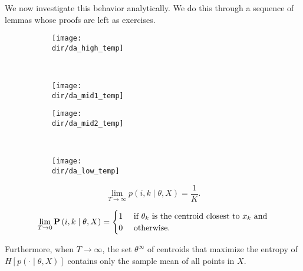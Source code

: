 We now investigate this behavior analytically. We do this through a
sequence of lemmas whose proofs are left as exercises.

\begin{figure}
    \centering
    \begin{subfigure}[b]{0.4\textwidth}
        \texttt{[image: \\dir/da\_high\_temp]}
        \caption{}
        \label{fig:da_high_temp}
    \end{subfigure}
    ~ %
    \begin{subfigure}[b]{0.4\textwidth}
        \texttt{[image: \\dir/da\_mid1\_temp]}
        \caption{}
        \label{fig:da_mid1_temp}
    \end{subfigure}
    
    \begin{subfigure}[b]{0.4\textwidth}
        \texttt{[image: \\dir/da\_mid2\_temp]}
        \caption{}
        \label{fig:da_mid2_temp}
    \end{subfigure}
    ~ %
    \begin{subfigure}[b]{0.4\textwidth}
        \texttt{[image: \\dir/da\_low\_temp]}
        \caption{}
        \label{fig:da_low_temp}
    \end{subfigure}
    \caption{}\label{fig:da_phase_trans}
\end{figure}

\begin{theorem}
\begin{equation}
\lim_{T \to \infty} p\left(i,k \mid \theta, X\right) = \frac{1}{K}.
\end{equation}

\begin{equation}
\lim_{T \to 0} \mathbf{P}\left(i,k \mid \theta, X\right) = \begin{cases}
1 & \text{ if $\theta_k$ is the centroid closest to $x_k$ and}\\
0 & \text{ otherwise}.
\end{cases}
\end{equation}

Furthermore, when $T \to \infty$, the set $\theta^\infty$ of centroids that maximize the entropy of $H\left[p\left(\cdot \mid \theta, X\right)\right]$ contains only the sample mean of all points in $X$.
\label{lem:da_extreme_temps}
\end{theorem}


